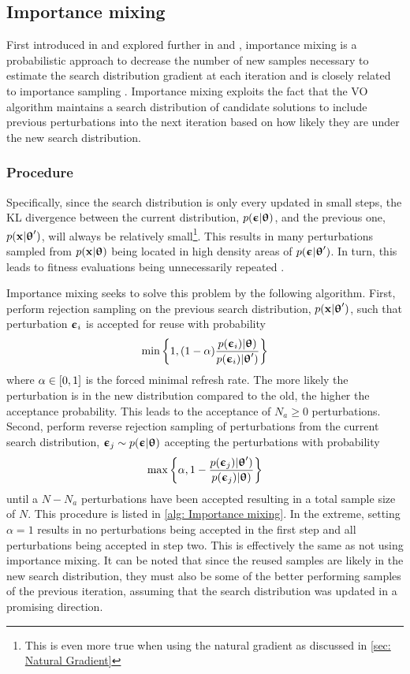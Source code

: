 \subsection{Importance mixing}\label{sec: Theory: Importance mixing}
First introduced in \cite{Sun2009} and explored further in \cite{Yi2009} and \cite{Schaul2011a}, importance mixing is a probabilistic approach to decrease the number of new samples necessary to estimate the search distribution gradient at each iteration and is closely related to importance sampling \cite{Goodfellow2016}. Importance mixing exploits the fact that the \gls{VO} algorithm maintains a search distribution of candidate solutions to include previous perturbations into the next iteration based on how likely they are under the new search distribution.

\subsubsection{Procedure}
Specifically, since the search distribution is only every updated in small steps, the \gls{KL} divergence between the current distribution, $p({\boldsymbol{\upepsilon}}|{\boldsymbol{\uptheta}})$, and the previous one, $p({\mathbf{x}}|{\boldsymbol{\uptheta}}')$, will always be relatively small\footnote{This is even more true when using the natural gradient as discussed in \autoref{sec: Natural Gradient}}. This results in many perturbations sampled from $p({\mathbf{x}}|{\boldsymbol{\uptheta}})$ being located in high density areas of $p({\boldsymbol{\upepsilon}}|{\boldsymbol{\uptheta}}')$. In turn, this leads to fitness evaluations being unnecessarily repeated \cite{Sun2009}.

Importance mixing seeks to solve this problem by the following algorithm. First, perform rejection sampling on the previous search distribution, $p({\mathbf{x}}|{\boldsymbol{\uptheta}}')$, such that perturbation ${\boldsymbol{\upepsilon}}_i$ is accepted for reuse with probability
\begin{equation}
    \min{\left\{1, (1-\alpha)\frac{p({\boldsymbol{\upepsilon}}_i)|{\boldsymbol{\uptheta}})}{p({\boldsymbol{\upepsilon}}_i)|{\boldsymbol{\uptheta}}')}\right\}}
\end{equation}
where $\alpha\in{\left[0,1\right]}$ is the forced minimal refresh rate. The more likely the perturbation is in the new distribution compared to the old, the higher the acceptance probability. This leads to the acceptance of $N_a\geq0$ perturbations. Second, perform reverse rejection sampling of perturbations from the current search distribution, ${\boldsymbol{\upepsilon}}_j\sim p({\boldsymbol{\upepsilon}}|{\boldsymbol{\uptheta}})$ accepting the perturbations with probability
\begin{equation}
    \max{\left\{\alpha, 1 - \frac{p({\boldsymbol{\upepsilon}}_j)|{\boldsymbol{\uptheta}}')}{p({\boldsymbol{\upepsilon}}_j)|{\boldsymbol{\uptheta}})}\right\}}
\end{equation}
until a $N-N_a$ perturbations have been accepted resulting in a total sample size of $N$. This procedure is listed in \autoref{alg: Importance mixing}. In the extreme, setting $\alpha=1$ results in no perturbations being accepted in the first step and all perturbations being accepted in step two. This is effectively the same as not using importance mixing. It can be noted that since the reused samples are likely in the new search distribution, they must also be some of the better performing samples of the previous iteration, assuming that the search distribution was updated in a promising direction.

